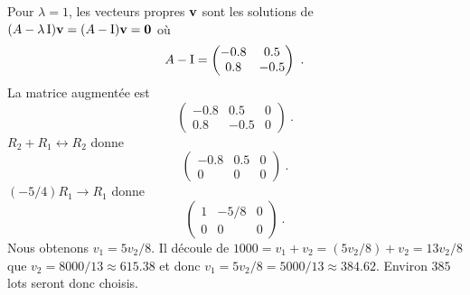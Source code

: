 {Pour $\lambda = 1$, les vecteurs propres $\mathbf{v}$ sont les solutions de
$(A-\lambda \operatorname{I})\mathbf{v} = (A- \operatorname{I})\mathbf{v} = \mathbf{0}$ où
\[
A - \Id = \begin{pmatrix} -0.8 & 0.5 \\ 0.8 & -0.5 \end{pmatrix} \ .
\]
La matrice augmentée est
\[
\left(\begin{array}{cc|c}
-0.8 & 0.5 & 0 \\ 0.8 & -0.5 & 0
\end{array}\right) \ .
\]
$R_2 + R_1 \leftrightarrow R_2$ donne
\[
\left(\begin{array}{cc|c}
-0.8 & 0.5 & 0 \\0 & 0 & 0
\end{array}\right) \ .
\]
$(-5/4)R_1 \rightarrow R_1$ donne
\[
\left(\begin{array}{cc|c}
1 & -5/8 & 0 \\0 & 0 & 0
\end{array}\right) \ .
\]
Nous obtenons $v_1 = 5v_2/8$.  Il découle de
$1000 = v_1+v_2 = (5v_2/8)+v_2 = 13v_2/8$ que
$v_2 = 8000/13 \approx 615.38$ et donc
$v_1 = 5v_2/8 = 5000/13\approx 384.62$.
Environ $385$ lots seront donc choisis.
}

